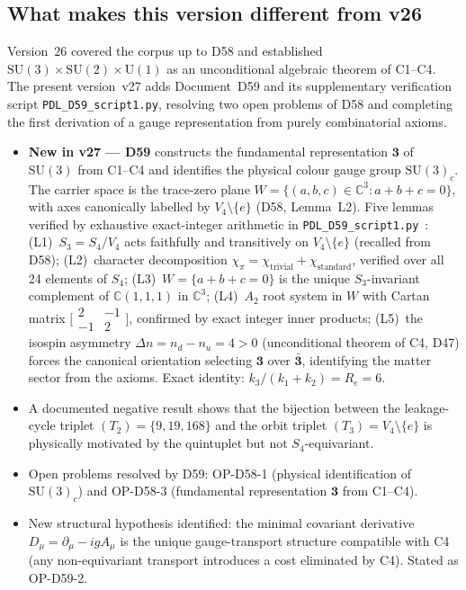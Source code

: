 \documentclass[11pt,a4paper]{article}
\theoremstyle{plain}
\theoremstyle{definition}
\theoremstyle{remark}
\begin{document}
\subsection{What makes this version different from v26}
\label{subsec:diffv26}
Version~26 covered the corpus up to D58 and established $\mathrm{SU}(3)\times\mathrm{SU}(2)\times\mathrm{U}(1)$ as an unconditional algebraic theorem of C1--C4. The present version~v27 adds Document~D59 and its supplementary verification script \texttt{PDL\_D59\_script1.py}, resolving two open problems of D58 and completing the first derivation of a gauge representation from purely combinatorial axioms.
 
\begin{itemize}
\item \textbf{New in v27 --- D59} constructs the fundamental representation $\mathbf{3}$ of $\mathrm{SU}(3)$ from C1--C4 and identifies the physical colour gauge group $\mathrm{SU}(3)_c$. The carrier space is the trace-zero plane $W = \{(a,b,c)\in\mathbb{C}^3 : a+b+c=0\}$, with axes canonically labelled by $V_4\setminus\{e\}$ (D58, Lemma~L2). Five lemmas verified by exhaustive exact-integer arithmetic in \texttt{PDL\_D59\_script1.py}~\cite{D59py}: (L1)~$S_3 = S_4/V_4$ acts faithfully and transitively on $V_4\setminus\{e\}$ (recalled from D58); (L2)~character decomposition $\chi_\pi = \chi_{\mathrm{trivial}} + \chi_{\mathrm{standard}}$, verified over all 24 elements of $S_4$; (L3)~$W = \{a+b+c=0\}$ is the unique $S_3$-invariant complement of $\mathbb{C}(1,1,1)$ in $\mathbb{C}^3$; (L4)~$A_2$ root system in $W$ with Cartan matrix $\bigl[\begin{smallmatrix}2&-1\\-1&2\end{smallmatrix}\bigr]$, confirmed by exact integer inner products; (L5)~the isospin asymmetry $\Delta n = n_d - n_u = 4 > 0$ (unconditional theorem of C4, D47) forces the canonical orientation selecting $\mathbf{3}$ over $\bar{\mathbf{3}}$, identifying the matter sector from the axioms. Exact identity: $k_3/(k_1+k_2) = R_e = 6$.
\item A documented negative result shows that the bijection between the leakage-cycle triplet $(T_2) = \{9,19,168\}$ and the orbit triplet $(T_3) = V_4\setminus\{e\}$ is physically motivated by the quintuplet but not $S_4$-equivariant.
\item Open problems resolved by D59: OP-D58-1 (physical identification of $\mathrm{SU}(3)_c$) and OP-D58-3 (fundamental representation $\mathbf{3}$ from C1--C4).
\item New structural hypothesis identified: the minimal covariant derivative $D_\mu = \partial_\mu - igA_\mu$ is the unique gauge-transport structure compatible with C4 (any non-equivariant transport introduces a cost eliminated by C4). Stated as OP-D59-2.
\end{itemize}
 
\end{document}
